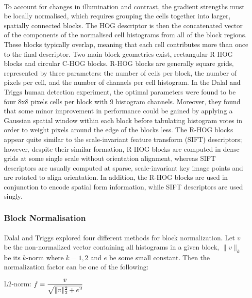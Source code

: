 		\paragraph{}To account for changes in illumination and contrast, the gradient strengths must be locally normalised, which requires grouping the cells together into larger, spatially connected blocks. The HOG descriptor is then the concatenated vector of the components of the normalised cell histograms from all of the block regions. These blocks typically overlap, meaning that each cell contributes more than once to the final descriptor. Two main block geometries exist, rectangular R-HOG blocks and circular C-HOG blocks. R-HOG blocks are generally square grids, represented by three parameters: the number of cells per block, the number of pixels per cell, and the number of channels per cell histogram. In the Dalal and Triggs human detection experiment, the optimal parameters were found to be four 8x8 pixels cells per block with 9 histogram channels. Moreover, they found that some minor improvement in performance could be gained by applying a Gaussian spatial window within each block before tabulating histogram votes in order to weight pixels around the edge of the blocks less. The R-HOG blocks appear quite similar to the scale-invariant feature transform (SIFT) descriptors; however, despite their similar formation, R-HOG blocks are computed in dense grids at some single scale without orientation alignment, whereas SIFT descriptors are usually computed at sparse, scale-invariant key image points and are rotated to align orientation. In addition, the R-HOG blocks are used in conjunction to encode spatial form information, while SIFT descriptors are used singly.
		
		\subsubsection{Block Normalisation}
		\paragraph{}Dalal and Triggs explored four different methods for block normalization. Let ${\displaystyle v}$ be the non-normalized vector containing all histograms in a given block, $\|{\displaystyle v}\|_{k}$ be its ${\displaystyle k}$-norm where ${\displaystyle k={1,2}}$ and ${\displaystyle e}$ be some small constant. Then the normalization factor can be one of the following:
		
		L2-norm: ${\displaystyle f={v \over {\sqrt {\|v\|_{2}^{2}+e^{2}}}}}$
		
